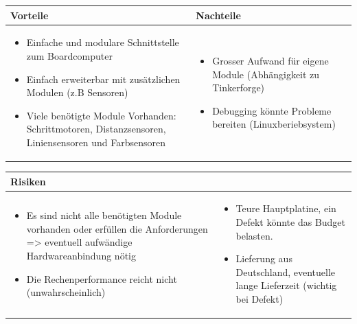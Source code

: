 \begin{table}[h]
\begin{tabular}{p{} | p{}}


\textbf{Vorteile} & \textbf{Nachteile} \\ \hline
	 
\begin{itemize}
\item Einfache und modulare Schnittstelle zum Boardcomputer
\item Einfach erweiterbar mit zusätzlichen Modulen (z.B Sensoren)
\item Viele benötigte Module Vorhanden: Schrittmotoren, Distanzsensoren, Liniensensoren und Farbsensoren
\end{itemize}
 &
\begin{itemize}
\item Grosser Aufwand für eigene Module (Abhängigkeit zu Tinkerforge)
\item Debugging könnte Probleme bereiten (Linuxberiebsystem) 
\end{itemize}
\end{tabular}
\end{table}


\begin{table}[h]
\begin{tabular}{p{}p{}}


\textbf{Risiken} & \\ \hline
	 
\begin{itemize}
\item Es sind nicht alle benötigten Module vorhanden oder erfüllen die Anforderungen => eventuell aufwändige Hardwareanbindung nötig
\item Die Rechenperformance reicht nicht (unwahrscheinlich)
\end{itemize}
&
\begin{itemize}
\item Teure Hauptplatine, ein Defekt könnte das Budget belasten.
\item Lieferung aus Deutschland, eventuelle lange Lieferzeit (wichtig bei Defekt)
\end{itemize}

 
\end{tabular}
\end{table}

\pagebreak